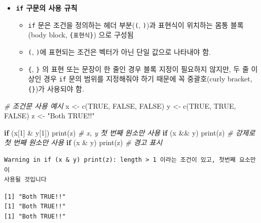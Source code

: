 \documentclass[
  11pt,
]{krantz}
\newenvironment{Shaded}{\begin{snugshade}}{\end{snugshade}}
\newcommand{\CommentTok}[1]{\textcolor[rgb]{0.37,0.37,0.37}{\textit{#1}}}
\newcommand{\ConstantTok}[1]{\textcolor[rgb]{0,0,0}{#1}}
\newcommand{\ControlFlowTok}[1]{\textcolor[rgb]{0.27,0.27,0.27}{\textbf{#1}}}
\newcommand{\DecValTok}[1]{\textcolor[rgb]{0.06,0.06,0.06}{#1}}
\newcommand{\FunctionTok}[1]{\textcolor[rgb]{0,0,0}{#1}}
\newcommand{\NormalTok}[1]{#1}
\newcommand{\OtherTok}[1]{\textcolor[rgb]{0.37,0.37,0.37}{#1}}
\newcommand{\SpecialCharTok}[1]{\textcolor[rgb]{0,0,0}{#1}}
\newcommand{\StringTok}[1]{\textcolor[rgb]{0.5,0.5,0.5}{#1}}
\providecommand{\tightlist}{%
  \setlength{\itemsep}{0pt}\setlength{\parskip}{0pt}}
\begin{document}
\normalsize

\begin{itemize}
\tightlist
\item
  \textbf{\texttt{if} 구문의 사용 규칙}

  \begin{itemize}
  \tightlist
  \item
    \texttt{if} 문은 조건을 정의하는 헤더 부분(\texttt{(}, \texttt{)})과 표현식이 위치하는 몸통 블록(body block, \texttt{\{표현식\}}) 으로 구성됨
  \item
    \texttt{(}, \texttt{)}에 표현되는 조건은 벡터가 아닌 단일 값으로 나타내야 함.
  \item
    \texttt{\{}, \texttt{\}} 의 표현 또는 문장이 한 줄인 경우 블록 지정이 필요하지 않지만, 두 줄 이상인 경우 \texttt{if} 문의 범위를 지정해줘야 하기 때문에 꼭 중괄호(curly bracket, \texttt{\{\}})가 사용되야 함.
  \end{itemize}
\end{itemize}

\footnotesize

\begin{Shaded}
\begin{Highlighting}[]
\CommentTok{\# 조건문 사용 예시}
\NormalTok{x }\OtherTok{\textless{}{-}} \FunctionTok{c}\NormalTok{(}\ConstantTok{TRUE}\NormalTok{, }\ConstantTok{FALSE}\NormalTok{, }\ConstantTok{FALSE}\NormalTok{)}
\NormalTok{y }\OtherTok{\textless{}{-}} \FunctionTok{c}\NormalTok{(}\ConstantTok{TRUE}\NormalTok{, }\ConstantTok{TRUE}\NormalTok{, }\ConstantTok{FALSE}\NormalTok{)}
\NormalTok{z }\OtherTok{\textless{}{-}} \StringTok{"Both TRUE!!"}

\ControlFlowTok{if}\NormalTok{ (x[}\DecValTok{1}\NormalTok{] }\SpecialCharTok{\&}\NormalTok{ y[}\DecValTok{1}\NormalTok{]) }\FunctionTok{print}\NormalTok{(z) }\CommentTok{\# x, y 첫 번째 원소만 사용}
\ControlFlowTok{if}\NormalTok{ (x }\SpecialCharTok{\&\&}\NormalTok{ y) }\FunctionTok{print}\NormalTok{(z) }\CommentTok{\# 강제로 첫 번째 원소만 사용}
\ControlFlowTok{if}\NormalTok{ (x }\SpecialCharTok{\&}\NormalTok{ y) }\FunctionTok{print}\NormalTok{(z) }\CommentTok{\# 경고 표시}
\end{Highlighting}
\end{Shaded}

\begin{verbatim}
Warning in if (x & y) print(z): length > 1 이라는 조건이 있고, 첫번째 요소만이
사용될 것입니다
\end{verbatim}

\begin{verbatim}
[1] "Both TRUE!!"
[1] "Both TRUE!!"
[1] "Both TRUE!!"
\end{verbatim}
\end{document}
